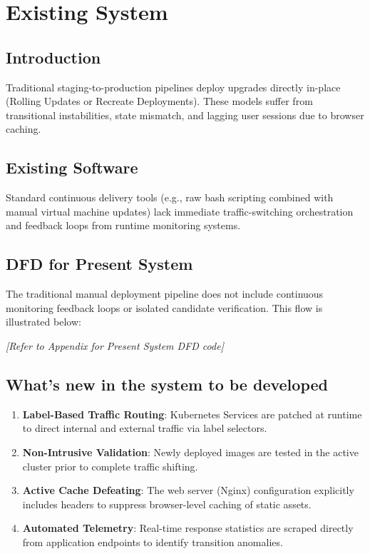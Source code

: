 \documentclass[12pt,a4paper]{article}
\begin{document}
\section{Existing System}
\subsection{Introduction}
Traditional staging-to-production pipelines deploy upgrades directly in-place (Rolling Updates or Recreate Deployments). These models suffer from transitional instabilities, state mismatch, and lagging user sessions due to browser caching.

\subsection{Existing Software}
Standard continuous delivery tools (e.g., raw bash scripting combined with manual virtual machine updates) lack immediate traffic-switching orchestration and feedback loops from runtime monitoring systems.

\subsection{DFD for Present System}
The traditional manual deployment pipeline does not include continuous monitoring feedback loops or isolated candidate verification. This flow is illustrated below:
\begin{center}
    \textit{[Refer to Appendix for Present System DFD code]}
\end{center}

\subsection{What’s new in the system to be developed}
\begin{enumerate}
    \item \textbf{Label-Based Traffic Routing}: Kubernetes Services are patched at runtime to direct internal and external traffic via label selectors.
    \item \textbf{Non-Intrusive Validation}: Newly deployed images are tested in the active cluster prior to complete traffic shifting.
    \item \textbf{Active Cache Defeating}: The web server (Nginx) configuration explicitly includes headers to suppress browser-level caching of static assets.
    \item \textbf{Automated Telemetry}: Real-time response statistics are scraped directly from application endpoints to identify transition anomalies.
\end{enumerate}
\end{document}
